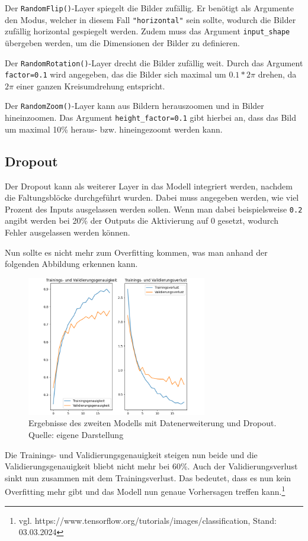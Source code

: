 \documentclass[11pt,oneside]{report}
\begin{document}
Der \verb+RandomFlip()+-Layer spiegelt die Bilder zufällig. Er benötigt als Argumente den Modus, welcher in diesem Fall \verb+"horizontal"+ sein sollte, wodurch die Bilder zufällig horizontal gespiegelt werden. Zudem muss das Argument \verb+input_shape+ übergeben werden, um die Dimensionen der Bilder zu definieren.

Der \verb+RandomRotation()+-Layer drecht die Bilder zufällig weit. Durch das Argument \verb+factor=0.1+ wird angegeben, das die Bilder sich maximal um \(0.1*2\pi\) drehen, da \(2\pi\) einer ganzen Kreisumdrehung entspricht.

Der \verb+RandomZoom()+-Layer kann aus Bildern herauszoomen und in Bilder hineinzoomen. Das Argument \verb+height_factor=0.1+ gibt hierbei an, dass das Bild um maximal 10\% heraus- bzw. hineingezoomt werden kann.

\subsection{Dropout}
Der Dropout kann als weiterer Layer in das Modell integriert werden, nachdem die Faltungsblöcke durchgeführt wurden. Dabei muss angegeben werden, wie viel Prozent des Inputs ausgelassen werden sollen. Wenn man dabei beispielsweise \verb+0.2+ angibt werden bei 20\% der Outputs die Aktivierung auf 0 gesetzt, wodurch Fehler ausgelassen werden können.

Nun sollte es nicht mehr zum Overfitting kommen, was man anhand der folgenden Abbildung erkennen kann.
\begin{figure}[H]
	\centering
	\caption{Ergebnisse des zweiten Modells mit Datenerweiterung und Dropout. Quelle: eigene Darstellung}
	\includegraphics[width=0.7\textwidth]{model}
\end{figure}
Die Trainings- und Validierungsgenauigkeit steigen nun beide und die Validierungsgenauigkeit bliebt nicht mehr bei 60\%. Auch der Validierungsverlust sinkt nun zusammen mit dem Trainingsverlust. Das bedeutet, dass es nun kein Overfitting mehr gibt und das Modell nun genaue Vorhersagen treffen kann.\footnote{vgl. https://www.tensorflow.org/tutorials/images/classification, Stand: 03.03.2024}
\end{document}
